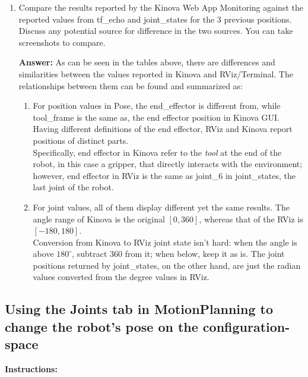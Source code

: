 \documentclass[12pt]{article}
\begin{document}
\begin{enumerate}
\begin{enumerate}
    \item Compare the results reported by the Kinova Web App Monitoring against the reported values from tf\_echo and joint\_states for the 3 previous positions. Discuss any potential source for difference in the two sources. You can take screenshots to compare. 
    
    \textbf{Answer: }As can be seen in the tables above, there are differences and similarities between the values reported in Kinova and RViz/Terminal. The relationships between them can be found and summarized as:

        \begin{enumerate}

            \item For position values in Pose, the end\_effector is different from, while tool\_frame is the same as, the end effector position in Kinova GUI. Having different definitions of the end effector, RViz and Kinova report positions of distinct parts. 
            \\Specifically, end effector in Kinova refer to the \textit{tool} at the end of the robot, in this case a gripper, that directly interacts with the environment; however, end effector in RViz is the same as joint\_6 in joint\_states, the last joint of the robot.
            
            \item For joint values, all of them display different yet the same results. The angle range of Kinova is the original $[0, 360]$, whereas that of the RViz is $[-180, 180]$.
            \\Conversion from Kinova to RViz joint state isn't hard: when the angle is above $180^\circ$, subtract $360$ from it; when below, keep it as is. The joint positions returned by joint\_states, on the other hand, are just the radian values converted from the degree values in RViz.
        
        \end{enumerate}

    \end{enumerate}

\end{enumerate}


\subsection{Using the Joints tab in MotionPlanning to change the robot’s pose on the configuration-space}

\textbf{Instructions:}
\end{document}
